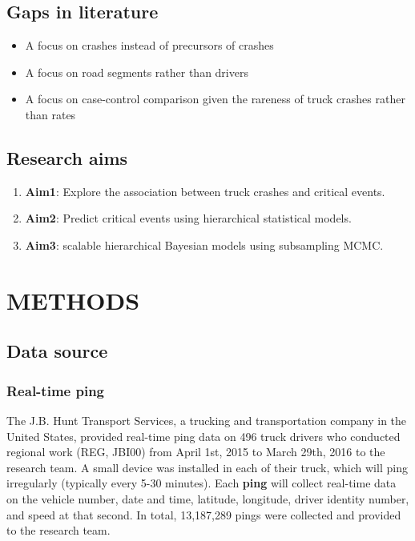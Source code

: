 \documentclass[12pt]{book}
\numberwithin{equation}{chapter}
\providecommand{\tightlist}{%
  \setlength{\itemsep}{0pt}\setlength{\parskip}{0pt}}
\begin{document}
\hypertarget{gaps-in-literature}{%
\section{Gaps in literature}\label{gaps-in-literature}}

\begin{itemize}
\tightlist
\item
  A focus on crashes instead of precursors of crashes
\item
  A focus on road segments rather than drivers
\item
  A focus on case-control comparison given the rareness of truck crashes rather than rates
\end{itemize}

\hypertarget{research-aims}{%
\section{Research aims}\label{research-aims}}

\begin{enumerate}
\def\labelenumi{\arabic{enumi}.}
\item
  \textbf{Aim1}: Explore the association between truck crashes and critical events.
\item
  \textbf{Aim2}: Predict critical events using hierarchical statistical models.
\item
  \textbf{Aim3}: scalable hierarchical Bayesian models using subsampling MCMC.
\end{enumerate}

\hypertarget{methods}{%
\chapter{METHODS}\label{methods}}

\hypertarget{data-source}{%
\section{Data source}\label{data-source}}

\hypertarget{real-time-ping}{%
\subsection{Real-time ping}\label{real-time-ping}}

The J.B. Hunt Transport Services, a trucking and transportation company in the United States,
provided real-time ping data on 496 truck drivers who conducted regional work (REG, JBI00) from April 1st, 2015 to March 29th, 2016 to the research team.
A small device was installed in each of their truck, which will ping irregularly (typically every 5-30 minutes).
Each \textbf{ping} will collect real-time data on the vehicle number, date and time, latitude, longitude, driver identity number, and speed at that second.
In total, 13,187,289 pings were collected and provided to the research team.
\end{document}
